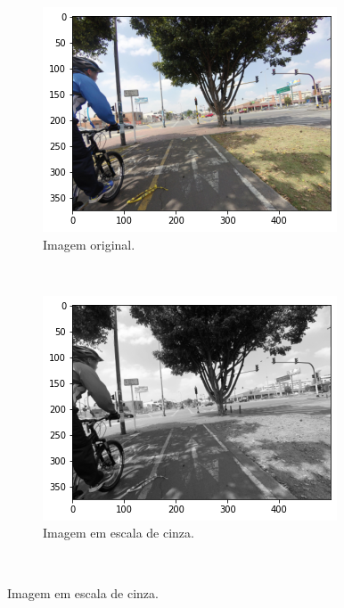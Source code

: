\begin{figure}[H]
   \caption{Limiarizações.}
   \centering
   \label{segment:fig:3}
    \begin{subfigure}[t]{0.45\textwidth}
        \centering
        \includegraphics[width=1\linewidth]{recursos/imagens/image_seg/mapi.png}
        \caption{Imagem original.}
        \label{segment:fig:3.1}
    \end{subfigure}%
    ~ 
    \begin{subfigure}[t]{0.45\textwidth}
        \centering
        \includegraphics[width=1\linewidth]{recursos/imagens/image_seg/gray_mapi.png}
        \caption{Imagem em escala de cinza.}
        \label{segment:fig:3.2}
    \end{subfigure}%
    ~ 
    

\end{figure}
